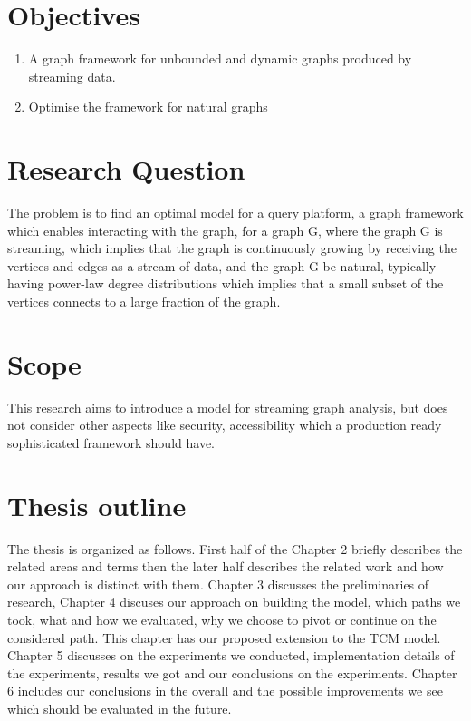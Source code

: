 \documentclass[12pt]{report}
\numberwithin{figure}{section}
\numberwithin{table}{section}
\begin{document}
\section{Objectives}
 

\begin{enumerate}
\item A graph framework for unbounded and dynamic graphs produced by streaming data. 
\item Optimise the framework for natural graphs
\end{enumerate}

\section{Research Question}
The problem is to find an optimal model for a query platform, a graph framework which enables interacting with the graph, for a graph G, where the graph G is streaming, which implies that the graph is continuously growing by receiving the vertices and edges as a stream of data, and the graph G be natural, typically having power-law degree distributions which implies that a small subset of the vertices connects to a large fraction of the graph.

\section{Scope}
This research aims to introduce a model for streaming graph analysis, but does not consider other aspects like security, accessibility which  a production ready sophisticated framework should have.

\section{Thesis outline}
The thesis is organized as follows. First half of the Chapter 2 briefly describes the related areas and terms then the later half describes the related work and how our approach is distinct with them. Chapter 3 discusses the preliminaries of research, Chapter 4 discuses our approach on building the model, which paths we took, what and how we evaluated, why we choose to pivot or continue on the considered path. This chapter has our proposed extension to the TCM model. Chapter 5 discusses on the experiments we conducted, implementation details of the experiments, results we got and our conclusions on the experiments. Chapter 6 includes our conclusions in the overall and the possible improvements we see which should be evaluated in the future.
\end{document}
